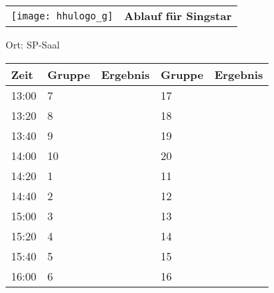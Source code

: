 \documentclass[a4paper,10pt]{article}
\def\spielg{Singstar}
\def\raumg{SP-Saal}
\begin{document}
   \newpage
  \begin{tabularx}{\textwidth}{lc}
    \texttt{[image: hhulogo\_g]}
  & {\Huge \textbf{Ablauf für \spielg}}
  \end{tabularx}
  \LARGE
  \begin{center}
    \vspace{1cm} 
    Ort: \raumg
  \end{center}
    \vspace{2cm} 
    \begin{tabularx}{\textwidth}{X||X|X||X|X}
	\textbf{Zeit} &\textbf{Gruppe} & \textbf{Ergebnis} &\textbf{Gruppe} & \textbf{Ergebnis}  	\\ \hline \hline
	13:00 &	7	&	&17	&	\\ \hline
	13:20 &	8	&	&18	&	\\ \hline
	13:40 &	9	&	&19	&	\\ \hline

	14:00 &	10	&	&20	&	\\ \hline
	14:20 &	1	&	&11	&	\\ \hline
	14:40 &	2	&	&12	&	\\ \hline

	15:00 &	3	&	&13	&	\\ \hline
	15:20 &	4	&	&14	&	\\ \hline
	15:40 &	5	&	&15	&	\\ \hline

	16:00 &	6	&	&16	&	\\ \hline
      
    \end{tabularx}
   
\end{document}
